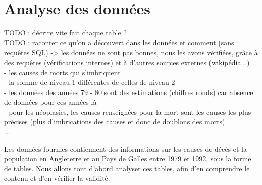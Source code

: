 \chapter{Analyse des données}

TODO : décrire vite fait chaque table ? \\
TODO : raconter ce qu'on a découvert dans les données et comment (sans requêtes SQL) -> les données ne sont pas bonnes, nous les avons vérifiées, grâce à des requêtes (vérifications internes) et à d'autres sources externes (wikipédia...) \\
 - les causes de morts qui s'imbriquent \\
 - la somme de niveau 1 différentes de celles de niveau 2 \\
 - les données des années 79 - 80 sont des estimations (chiffres ronds) car absence de données pour ces années là \\
 - pour les néoplasies, les causes renseignées pour la mort sont les causes les plus précises (plus d'imbrications des causes et donc de doublons des morts) \\
 ...

 Les données fournies contiennent des informations sur les causes de décès et la population en Angleterre et au Pays de Galles entre 1979 et 1992, sous la forme de tables. Nous allons tout d'abord analyser ces tables, afin d'en comprendre le contenu et d'en vérifier la validité. \\

